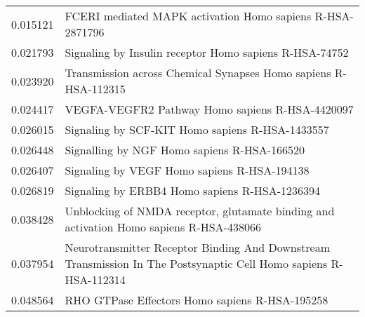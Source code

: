 \begin{longtable}{p{2.4cm}p{14.5cm}}
                 0.015121 &                                                          FCERI mediated MAPK activation Homo sapiens R-HSA-2871796 \\
                 0.021793 &                                                             Signaling by Insulin receptor Homo sapiens R-HSA-74752 \\
                 0.023920 &                                                    Transmission across Chemical Synapses Homo sapiens R-HSA-112315 \\
                 0.024417 &                                                                    VEGFA-VEGFR2 Pathway Homo sapiens R-HSA-4420097 \\
                 0.026015 &                                                                    Signaling by SCF-KIT Homo sapiens R-HSA-1433557 \\
                 0.026448 &                                                                        Signalling by NGF Homo sapiens R-HSA-166520 \\
                 0.026407 &                                                                        Signaling by VEGF Homo sapiens R-HSA-194138 \\
                 0.026819 &                                                                      Signaling by ERBB4 Homo sapiens R-HSA-1236394 \\
                 0.038428 &                            Unblocking of NMDA receptor, glutamate binding and activation Homo sapiens R-HSA-438066 \\
                 0.037954 &  Neurotransmitter Receptor Binding And Downstream Transmission In The  Postsynaptic Cell Homo sapiens R-HSA-112314 \\
                 0.048564 &                                                                     RHO GTPase Effectors Homo sapiens R-HSA-195258 \\
\end{longtable}


